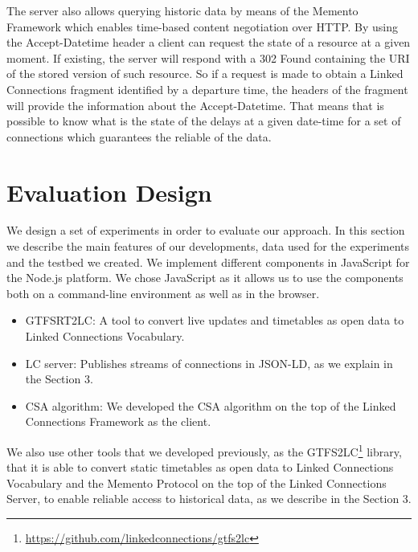 \documentclass[sw]{iosart2x}
\begin{document}
The server also allows querying historic data by means of the Memento Framework\cite{van2010http} which enables time-based content negotiation over HTTP. By using the Accept-Datetime header a client can request the state of a resource at a given moment. If existing, the server will respond with a 302 Found containing the URI of the stored version of such resource. So if a request is made to obtain a Linked Connections fragment identified by a departure time, the headers of the fragment will provide the information about the Accept-Datetime. That means that is possible to know what is the state of the delays at a given date-time for a set of connections which guarantees the reliable of the data.


\section{Evaluation Design}

We design a set of experiments in order to evaluate our approach. In this section we describe the main features of our developments, data used for the experiments and the testbed we created.
We implement different components in JavaScript for the Node.js platform. We chose JavaScript as it allows us to use the components both on a command-line environment as well as in the browser.
\begin{itemize}
\item GTFSRT2LC: A tool to convert live updates and timetables as open data to Linked Connections Vocabulary.
\item LC server: Publishes streams of connections in JSON-LD, as we explain in the Section 3.
\item CSA algorithm: We developed the CSA algorithm on the top of the Linked Connections Framework as the client.
\end{itemize}

We also use other tools that we developed previously, as the GTFS2LC\footnote{\url{https://github.com/linkedconnections/gtfs2lc}} library, that it is able to convert static timetables as open data to Linked Connections Vocabulary and the Memento Protocol on the top of the Linked Connections Server\cite{rojas2017providing}, to enable reliable access to historical data, as we describe in the Section 3.
\end{document}

